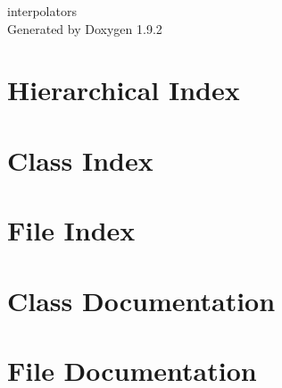 \documentclass[twoside]{book}
\newcommand{\+}{\discretionary{\mbox{\scriptsize$\hookleftarrow$}}{}{}}
\newcommand{\clearemptydoublepage}{%
    \newpage{\pagestyle{empty}\cleardoublepage}%
  }
\begin{document}
  \raggedbottom
    \hypersetup{pageanchor=false,
                bookmarksnumbered=true,
                pdfencoding=unicode
               }
  \begin{titlepage}
  \vspace*{7cm}
  \begin{center}%
  {\Large interpolators}\\
  \vspace*{1cm}
  {\large Generated by Doxygen 1.9.2}\\
  \end{center}
  \end{titlepage}
  \clearemptydoublepage
  \tableofcontents
  \clearemptydoublepage
  \hypersetup{pageanchor=true}
\chapter{Hierarchical Index}

\chapter{Class Index}

\chapter{File Index}

\chapter{Class Documentation}









\chapter{File Documentation}








  \backmatter
  \newpage
  \clearemptydoublepage
  \printindex
\end{document}
